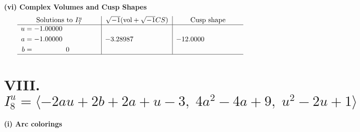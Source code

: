\documentclass[1p]{elsarticle_modified}
\theoremstyle{definition}
\newcommand{\I}{\sqrt{-1}}
\begin{document}
\newpage\flushleft \textbf{(vi) Complex Volumes and Cusp Shapes}
$$\begin{array}{c|c|c}  
\text{Solutions to }I^u_{7}& \I (\text{vol} + \sqrt{-1}CS) & \text{Cusp shape}\\
 \hline 
\begin{aligned}
u &= -1.00000\phantom{ +0.000000I} \\
a &= -1.00000\phantom{ +0.000000I} \\
b &= \phantom{-0.000000 } 0\end{aligned}
 & -3.28987\phantom{ +0.000000I} & -12.0000\phantom{ +0.000000I}\\
 \hline 
 \end{array}$$\newpage\newpage\renewcommand{\arraystretch}{1}
\centering \section*{VIII. $I^u_{8}= \langle -2 a u+2 b+2 a+u-3,\;4 a^2-4 a+9,\;u^2-2 u+1 \rangle$}
\flushleft \textbf{(i) Arc colorings}\\
\end{document}
